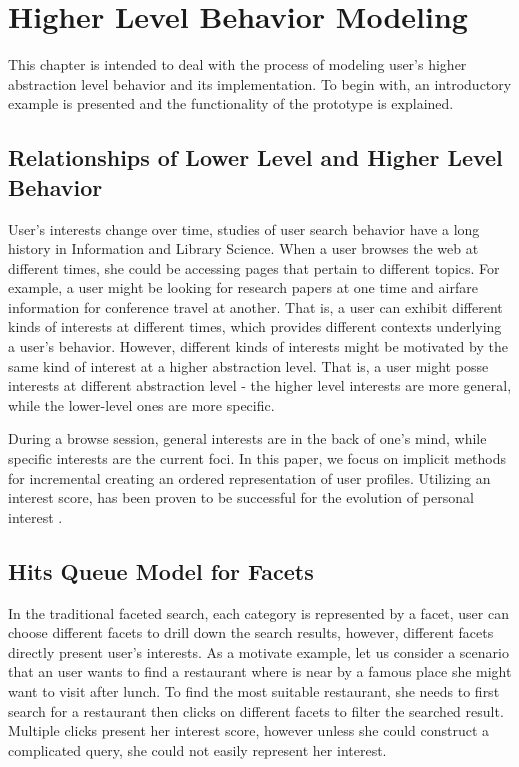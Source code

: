 
\chapter{Higher Level Behavior Modeling}

This chapter is intended to deal with the process of modeling user's higher abstraction level behavior and its implementation. To begin with, an introductory example is presented and the functionality of the prototype is explained.

\section{Relationships of Lower Level and Higher Level Behavior}

User's interests change over time, studies of user search behavior have a long history in Information and Library Science\cite{Bates1979}\cite{Rose}\cite{Spink2002}. When a user browses the web at different times, she could be accessing pages that pertain to different topics. For example, a user might be looking for research papers at one time and airfare information for conference travel at another. That is, a user can exhibit different kinds of interests at different times, which provides different contexts underlying a user's behavior. However, different kinds of interests might be motivated by the same kind of interest at a higher abstraction level. That is, a user might posse interests at different abstraction level - the higher level interests are more general, while the lower-level ones are more specific.

During a browse session, general interests are in the back of one's mind, while specific interests are the current foci. In this paper, we focus on implicit methods for incremental creating an ordered representation of user profiles. Utilizing an interest score, has been proven to be successful for the evolution of personal interest \cite{Sieg2007}. 

\section{Hits Queue Model for Facets}

In the traditional faceted search, each category is represented by a facet, user can choose different facets to drill down the search results, however, different facets directly present user's interests. As a motivate example, let us consider a scenario that an user wants to find a restaurant where is near by a famous place she might want to visit after lunch. To find the most suitable restaurant, she needs to first search for a restaurant then clicks on different facets to filter the searched result. Multiple clicks present her interest score, however unless she could construct a complicated query, she could not easily represent her interest.

